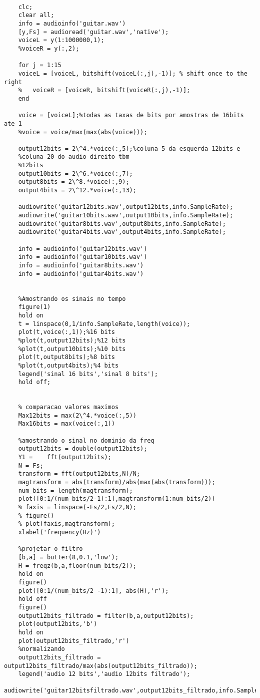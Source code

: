 \begin{lstlisting}

	clc;
	clear all;
	info = audioinfo('guitar.wav')
	[y,Fs] = audioread('guitar.wav','native');
	voiceL = y(1:1000000,1);
	%voiceR = y(:,2);
	
	for j = 1:15
	voiceL = [voiceL, bitshift(voiceL(:,j),-1)]; % shift once to the right
	%   voiceR = [voiceR, bitshift(voiceR(:,j),-1)];
	end
	
	voice = [voiceL];%todas as taxas de bits por amostras de 16bits ate 1
	%voice = voice/max(max(abs(voice)));
	
	output12bits = 2\^4.*voice(:,5);%coluna 5 da esquerda 12bits e 
	%coluna 20 do audio direito tbm
	%12bits
	output10bits = 2\^6.*voice(:,7);
	output8bits = 2\^8.*voice(:,9);
	output4bits = 2\^12.*voice(:,13);
	
	audiowrite('guitar12bits.wav',output12bits,info.SampleRate);
	audiowrite('guitar10bits.wav',output10bits,info.SampleRate);
	audiowrite('guitar8bits.wav',output8bits,info.SampleRate);
	audiowrite('guitar4bits.wav',output4bits,info.SampleRate);
	
	info = audioinfo('guitar12bits.wav')
	info = audioinfo('guitar10bits.wav')
	info = audioinfo('guitar8bits.wav')
	info = audioinfo('guitar4bits.wav')
	
	
	%Amostrando os sinais no tempo
	figure(1)
	hold on
	t = linspace(0,1/info.SampleRate,length(voice));
	plot(t,voice(:,1));%16 bits
	%plot(t,output12bits);%12 bits
	%plot(t,output10bits);%10 bits
	plot(t,output8bits);%8 bits
	%plot(t,output4bits);%4 bits
	legend('sinal 16 bits','sinal 8 bits');
	hold off;
	
	
	% comparacao valores maximos
	Max12bits = max(2\^4.*voice(:,5))
	Max16bits = max(voice(:,1))
	
	%amostrando o sinal no dominio da freq
	output12bits = double(output12bits);
	Y1 =    fft(output12bits);
	N = Fs;
	transform = fft(output12bits,N)/N;
	magtransform = abs(transform)/abs(max(abs(transform)));
	num_bits = length(magtransform);
	plot([0:1/(num_bits/2-1):1],magtransform(1:num_bits/2))
	% faxis = linspace(-Fs/2,Fs/2,N);
	% figure()
	% plot(faxis,magtransform);
	xlabel('frequency(Hz)')
	
	%projetar o filtro
	[b,a] = butter(8,0.1,'low');
	H = freqz(b,a,floor(num_bits/2));
	hold on
	figure()
	plot([0:1/(num_bits/2 -1):1], abs(H),'r');
	hold off
	figure()
	output12bits_filtrado = filter(b,a,output12bits);
	plot(output12bits,'b')
	hold on
	plot(output12bits_filtrado,'r')
	%normalizando
	output12bits_filtrado = output12bits_filtrado/max(abs(output12bits_filtrado));
	legend('audio 12 bits','audio 12bits filtrado');
	audiowrite('guitar12bitsfiltrado.wav',output12bits_filtrado,info.SampleRate);
	

\end{lstlisting}

